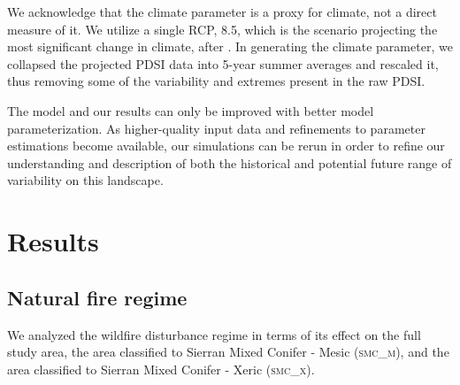 \documentclass[12pt]{article}
\begin{document}
\begin{spacing}{1}
We acknowledge that the climate parameter is a proxy for climate, not a direct measure of it. We utilize a single RCP, 8.5, which is the scenario projecting the most significant change in climate, after \citet{Cook2014}. In generating the climate parameter, we collapsed the projected PDSI data into 5-year summer averages and rescaled it, thus removing some of the variability and extremes present in the raw PDSI.

The model and our results can only be improved with better model parameterization. As higher-quality input data and refinements to parameter estimations become available, our simulations can be rerun in order to refine our understanding and description of both the historical and potential future range of variability on this landscape.











\section{Results}

\subsection*{Natural fire regime}

We analyzed the wildfire disturbance regime in terms of its effect on the full study area, the area classified to Sierran Mixed Conifer - Mesic (\textsc{smc\_m}), and the area classified to Sierran Mixed Conifer - Xeric (\textsc{smc\_x}).


\end{spacing}
\end{document}
